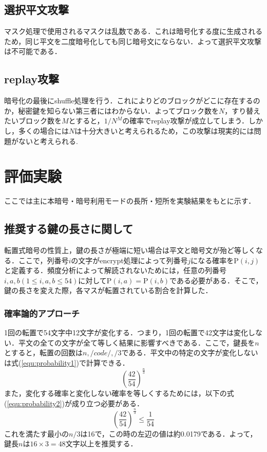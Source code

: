 \documentclass[a4j,titlepage]{jsarticle}
\begin{document}
\subsection{選択平文攻撃}
マスク処理で使用されるマスクは乱数である．これは暗号化する度に生成されるため，同じ平文を二度暗号化しても同じ暗号文にならない．よって選択平文攻撃は不可能である．

\subsection{replay攻撃}
暗号化の最後にshuffle処理を行う．これによりどのブロックがどこに存在するのか，秘密鍵を知らない第三者にはわからない．よってブロック数を\(N\)，すり替えたいブロック数を\(M\)とすると，\(1/N^M\)の確率でreplay攻撃が成立してしまう．しかし，多くの場合には\(N\)は十分大きいと考えられるため，この攻撃は現実的には問題がないと考えられる.

\section{評価実験}
ここでは主に本暗号・暗号利用モードの長所・短所を実験結果をもとに示す．
\subsection{推奨する鍵の長さに関して}
転置式暗号の性質上，鍵の長さが極端に短い場合は平文と暗号文が殆ど等しくなる．ここで，列番号\(i\)の文字がencrypt処理によって列番号\(j\)になる確率を\(\mathrm{P}(i,j)\)と定義する．頻度分析によって解読されないためには，任意の列番号\(i,a,b(1\leq i,a,b\leq 54)\)に対して\(\mathrm{P}(i,a)=\mathrm{P}(i,b)\)である必要がある．そこで，鍵の長さを変えた際，各マスが転置されている割合を計算した．

\subsubsection{確率論的アプローチ}
1回の転置で54文字中12文字が変化する．つまり，1回の転置で42文字は変化しない．平文の全ての文字が全て等しく結果に影響すべきである．ここで，鍵長を\(n\)とすると，転置の回数は\(n,/code{/},/3\)である．平文中の特定の文字が変化しないは式(\ref{equ:probability1})で計算できる．
\[\left(\frac{42}{54}\right)^\frac{n}{3} \label{equ:probability1}\]
また，変化する確率と変化しない確率を等しくするためには，以下の式(\ref{equ:probability2})が成り立つ必要がある．
\[\left(\frac{42}{54}\right)^\frac{n}{3} \leq \frac{1}{54} \label{equ:probability2}\]
これを満たす最小の\(n/3\)は16で，この時の左辺の値は約0.0179である．よって，鍵長\(n\)は\(16\times3=48\)文字以上を推奨する．
\end{document}
